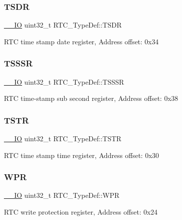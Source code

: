 \subsubsection{\texorpdfstring{TSDR}{TSDR}}
{\footnotesize\ttfamily \mbox{\hyperlink{core__sc300_8h_aec43007d9998a0a0e01faede4133d6be}{\+\_\+\+\_\+\+IO}} uint32\+\_\+t R\+T\+C\+\_\+\+Type\+Def\+::\+T\+S\+DR}

R\+TC time stamp date register, Address offset\+: 0x34 \mbox{\label{struct_r_t_c___type_def_a1e8b4b987496ee1c0c6f16b0a94ea1a1}} 
\subsubsection{\texorpdfstring{TSSSR}{TSSSR}}
{\footnotesize\ttfamily \mbox{\hyperlink{core__sc300_8h_aec43007d9998a0a0e01faede4133d6be}{\+\_\+\+\_\+\+IO}} uint32\+\_\+t R\+T\+C\+\_\+\+Type\+Def\+::\+T\+S\+S\+SR}

R\+TC time-\/stamp sub second register, Address offset\+: 0x38 \mbox{\label{struct_r_t_c___type_def_a1ddbb2a5eaa54ff43835026dec99ae1c}} 
\subsubsection{\texorpdfstring{TSTR}{TSTR}}
{\footnotesize\ttfamily \mbox{\hyperlink{core__sc300_8h_aec43007d9998a0a0e01faede4133d6be}{\+\_\+\+\_\+\+IO}} uint32\+\_\+t R\+T\+C\+\_\+\+Type\+Def\+::\+T\+S\+TR}

R\+TC time stamp time register, Address offset\+: 0x30 \mbox{\label{struct_r_t_c___type_def_ad54765af56784498a3ae08686b79a1ff}} 
\subsubsection{\texorpdfstring{WPR}{WPR}}
{\footnotesize\ttfamily \mbox{\hyperlink{core__sc300_8h_aec43007d9998a0a0e01faede4133d6be}{\+\_\+\+\_\+\+IO}} uint32\+\_\+t R\+T\+C\+\_\+\+Type\+Def\+::\+W\+PR}

R\+TC write protection register, Address offset\+: 0x24 \mbox{\label{struct_r_t_c___type_def_ad93017bb0a778a2aad9cd71211fc770a}} 
